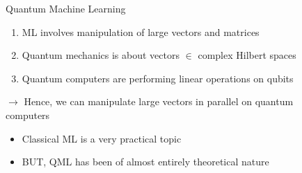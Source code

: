 \documentclass[10pt]{beamer}
\begin{document}
{
\begin{frame}[fragile]{Quantum Machine Learning}

\begin{enumerate}
\item ML involves manipulation of large vectors and matrices
\item Quantum mechanics is about vectors $\in$ complex Hilbert spaces
\item Quantum computers are performing linear operations on qubits
\end{enumerate}
\hspace{3mm}$\rightarrow$ Hence, we can manipulate large vectors in parallel on quantum\\ \hspace{8mm}computers\\
\vspace{3mm}
\centering{\textcolor{orange}{So can we use QC to improve classical ML algorithms??}}
\vspace{3mm}
\begin{itemize}
\item Classical ML is a very practical topic\\
\item BUT, QML has been of almost entirely theoretical nature
\end{itemize}
\end{frame}
}
\end{document}
